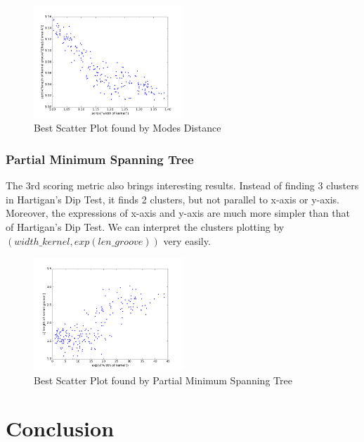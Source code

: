 \documentclass[fleqn]{SelfArx} %
\begin{document}
\begin{figure}[h]
  \centering\includegraphics[width=0.5\textwidth]{distance}
  \caption{Best Scatter Plot found by Modes Distance}
\end{figure}

\subsubsection{Partial Minimum Spanning Tree}
The 3rd scoring metric also brings interesting results. Instead of finding 3 clusters in Hartigan's Dip Test, it finds 2 clusters, but not parallel to x-axis or y-axis. Moreover, the expressions of x-axis and y-axis are much more simpler than that of Hartigan's Dip Test. We can interpret the clusters plotting by $(width\_kernel, exp(len\_groove))$ very easily.

\begin{figure}[h]
  \centering\includegraphics[width=0.5\textwidth]{mst}
  \caption{Best Scatter Plot found by Partial Minimum Spanning Tree}
\end{figure}

\section{Conclusion}






\end{document}
